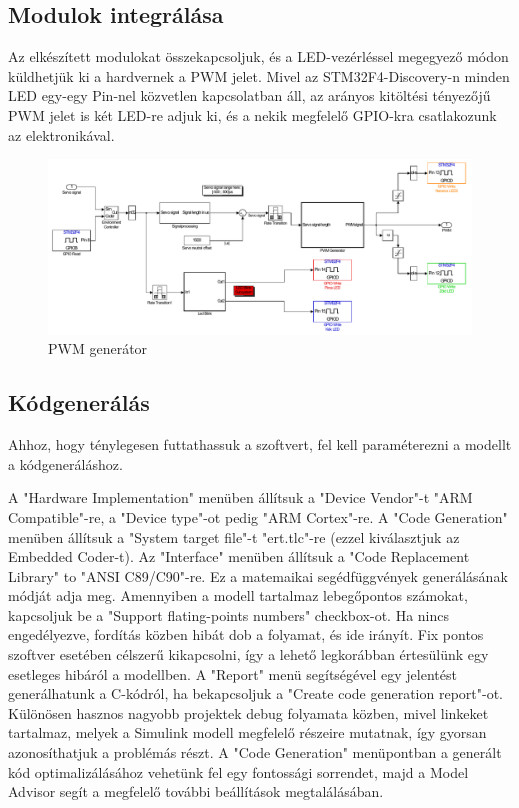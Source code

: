 \subsection{Modulok integrálása}

Az elkészített modulokat összekapcsoljuk, és a LED-vezérléssel megegyező módon küldhetjük ki a hardvernek a PWM jelet. Mivel az STM32F4-Discovery-n minden LED egy-egy Pin-nel közvetlen kapcsolatban áll, az arányos kitöltési tényezőjű PWM jelet is két LED-re adjuk ki, és a nekik megfelelő GPIO-kra csatlakozunk az elektronikával.

\begin{figure}[H]
	\centering
	\includegraphics[width=\textwidth]{fig/model}
	\caption{PWM generátor}
	\label{fig:Jelfeldolgozó modell hardver I/O interfésszel integrálva}
\end{figure}

\subsection{Kódgenerálás}

Ahhoz, hogy ténylegesen futtathassuk a szoftvert, fel kell paraméterezni a modellt a kódgeneráláshoz.

A "Hardware Implementation" menüben állítsuk a "Device Vendor"-t "ARM Compatible"-re, a "Device type"-ot pedig "ARM Cortex"-re.
A "Code Generation" menüben állítsuk a "System target file"-t "ert.tlc"-re (ezzel kiválasztjuk az Embedded Coder-t).
Az "Interface" menüben állítsuk a "Code Replacement Library" to "ANSI C89/C90"-re. Ez a matemaikai segédfüggvények generálásának módját adja meg.
Amennyiben a modell tartalmaz lebegőpontos számokat, kapcsoljuk be a "Support flating-points numbers" checkbox-ot. Ha nincs engedélyezve, fordítás közben hibát dob a folyamat, és ide irányít. Fix pontos szoftver esetében célszerű kikapcsolni, így a lehető legkorábban értesülünk egy esetleges hibáról a modellben.
A "Report" menü segítségével egy jelentést generálhatunk a C-kódról, ha bekapcsoljuk a "Create code generation report"-ot. Különösen hasznos nagyobb projektek debug folyamata közben, mivel linkeket tartalmaz, melyek a Simulink modell megfelelő részeire mutatnak, így gyorsan azonosíthatjuk a problémás részt.
A "Code Generation" menüpontban a generált kód optimalizálásához vehetünk fel egy fontossági sorrendet, majd a Model Advisor segít a megfelelő további beállítások megtalálásában.

